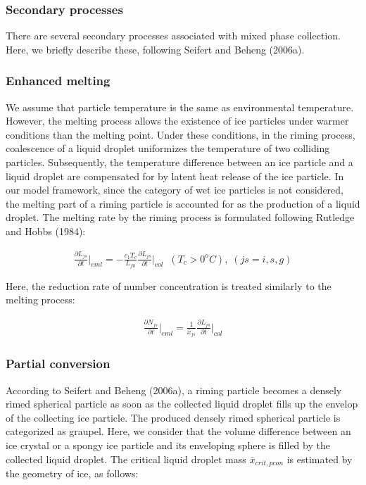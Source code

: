 \subsubsection{Secondary processes}
There are several secondary processes associated with mixed phase collection. Here, we briefly describe these, following Seifert and Beheng (2006a).

\subsubsection{Enhanced melting}
We assume that particle temperature is the same as environmental temperature. However, the melting process allows the existence of ice particles under warmer conditions than the melting point. Under these conditions, in the riming process, coalescence of a liquid droplet uniformizes the temperature of two colliding particles. Subsequently, the temperature difference between an ice particle and a liquid droplet are compensated for by latent heat release of the ice particle. In our model framework, since the category of wet ice particles is not considered, the melting part of a riming particle is accounted for as the production of a liquid droplet. The melting rate by the riming process is formulated following Rutledge and Hobbs (1984):

\begin{eqnarray}
\frac{\partial L_{js}}{\partial t}\Bigr|_{eml}=-\frac{c_{1}T_{c}}{L_{f0}}\frac{\partial L_{js}}{\partial t}\Bigr|_{col}\;\;(T_{c}>0^{o}C),\;(js=i,s,g)\label{sn205}
\end{eqnarray}

Here, the reduction rate of number concentration is treated similarly to the melting process:

\begin{eqnarray}
\frac{\partial N_{js}}{\partial t}\Bigr|_{eml}=\frac{1}{\bar{x}_{js}}\frac{\partial L_{js}}{\partial t}\Bigr|_{col}\label{sn206}
\end{eqnarray}

\subsubsection{Partial conversion}
According to Seifert and Beheng (2006a), a riming particle becomes a densely rimed spherical particle as soon as the collected liquid droplet fills up the envelop of the collecting ice particle. The produced densely rimed spherical particle is categorized as graupel. Here, we consider that the volume difference between an ice crystal or a spongy ice particle and its enveloping sphere is filled by the collected liquid droplet. The critical liquid droplet mass $\bar{x}_{crit,pcon}$ is estimated by the geometry of ice, as follows:


